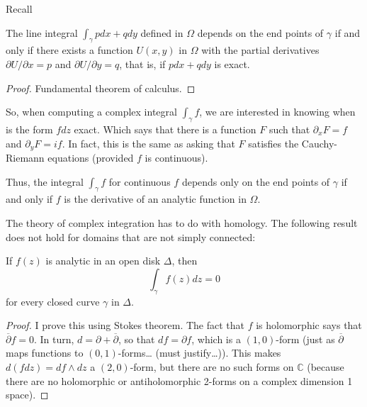 Recall
\begin{theorem}[Stokes]
\label{theorem-Stokes}
\begin{reference}
\cite[Chapter 4, Theorem 1]{ahl}
\end{reference}
The line integral $\int_\gamma p dx +q dy$ defined in $\Omega$ depends on the
end points of $\gamma$ if and only if there exists a function $U(x,y)$ in
$\Omega$ with the partial derivatives $\partial U/\partial x=p$ and 
$\partial U/\partial y=q$, that is, if $pdx +qdy$ is exact.
\end{theorem}

\begin{proof}
Fundamental theorem of calculus.
\end{proof}
So, when computing a complex integral $\int_\gamma f$, we are interested in
knowing when is the form $fdz$ exact. Which says that there is a function $F$
such that $\partial_x F=f$ and $\partial_y F=if$. In fact, this is the same as
asking that $F$ satisfies the Cauchy-Riemann equations (provided $f$ is
continuous).

Thus, the integral $\int_\gamma f$ for continuous $f$ depends only on the end
points of $\gamma$ if and only if $f$ is the derivative of an analytic function
in $\Omega$.

\medskip\noindent

The theory of complex integration has to do with homology. The following
result does not hold for domains that are not simply connected:

\begin{theorem}[Cauchy]
\label{theorem-Cauchy}
If $f(z)$ is analytic in an open disk $\Delta$, then
\begin{equation}
\label{equation-Cauchy-theorem}
\int_\gamma f(z)dz=0
\end{equation}
for every closed curve $\gamma$ in $\Delta$.
\end{theorem}

\begin{proof}
I prove this using Stokes theorem. The fact that $f$ is holomorphic says that
$\overline{\partial}f=0$. In turn, $d=\partial+\overline{\partial}$, so that
$df=\partial f$, which is a $(1,0)$-form (just as $\overline{\partial}$ maps
functions to $(0,1)$-forms… (must justify…)). This makes $d(fdz)=df\wedge dz$ a
$(2,0)$-form, but there are no such forms on $\mathbb{C}$ (because there are no
holomorphic or antiholomorphic 2-forms on a complex dimension 1 space).
\end{proof}

